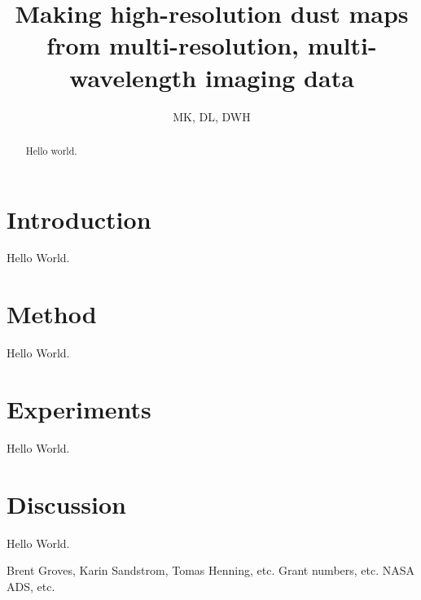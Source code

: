 \documentclass[12pt, preprint]{aastex}
\begin{document}
\title{Making high-resolution dust maps from multi-resolution, multi-wavelength imaging data}
\author{MK, DL, DWH}

\begin{abstract}
Hello world.
\end{abstract}

\section{Introduction}

Hello World.

\section{Method}

Hello World.

\section{Experiments}

Hello World.

\section{Discussion}

Hello World.

\acknowledgements
Brent Groves, Karin Sandstrom, Tomas Henning, etc.
Grant numbers, etc.
NASA ADS, etc.
\end{document}
